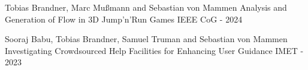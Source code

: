 

\begin{cventries}

  \cventry
    {Tobias Brandner, Marc Mußmann and Sebastian von Mammen} %
    {Analysis and Generation of Flow in 3D Jump'n'Run Games} %
    {{\href{https://ieeexplore.ieee.org/abstract/document/10645536}{\faFilePdfO}}} %
    {IEEE CoG - 2024} %
    {}

  \cventry
    {Sooraj Babu, Tobias Brandner, Samuel Truman and Sebastian von Mammen} %
    {Investigating Crowdsourced Help Facilities for Enhancing User Guidance} %
    {{\href{https://ieeexplore.ieee.org/abstract/document/10645536}{\faFilePdfO}}} %
    {IMET - 2023} %
    {}

\end{cventries}
